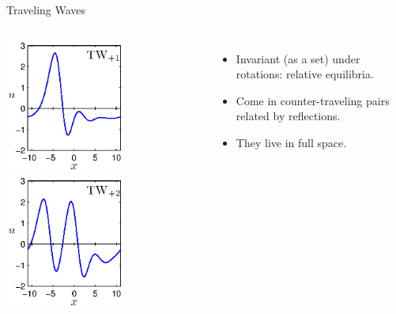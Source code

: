 \documentclass{beamer}
\begin{document}
\begin{frame}{Traveling Waves}
 \begin{columns}
 \includegraphics[width=0.6\textwidth]{../../figs/ks22_TW1_profile}\\
 \includegraphics[width=0.6\textwidth]{../../figs/ks22_TW2_profile}%
 \begin{itemize}
 \item Invariant (as a set) under rotations: relative equilibria.
 \item Come in counter-traveling pairs related by reflections.
 \item They live in full space.
\end{itemize}

 \end{columns}
\end{frame}
\end{document}
